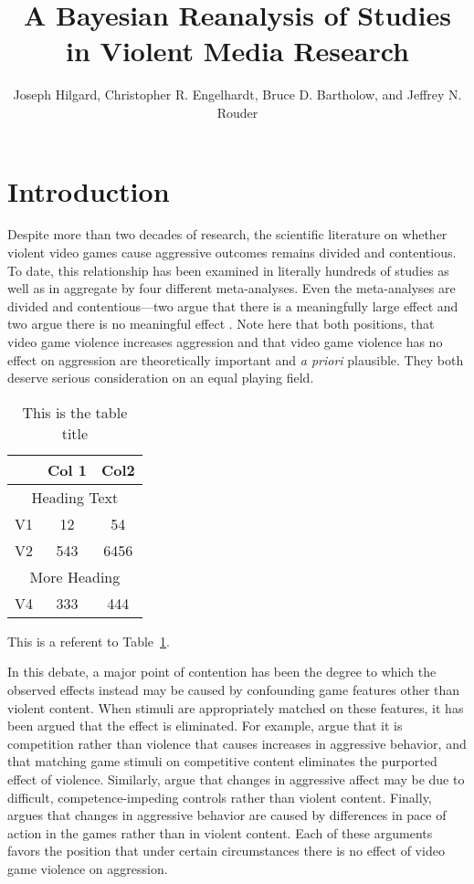 \documentclass[fignum,nobf,man]{apa}
\author{Joseph Hilgard, Christopher R. Engelhardt, Bruce D. Bartholow, and Jeffrey N. Rouder}
\title{A Bayesian Reanalysis of Studies in Violent Media Research}
\affiliation{University of Missouri}
\begin{document}
\maketitle

\section*{Introduction}
Despite more than two decades of research, the scientific literature on whether violent video games cause aggressive outcomes remains divided and contentious. To date, this relationship has been examined in literally hundreds of studies as well as in aggregate by four different meta-analyses. Even the meta-analyses are divided and contentious---two argue that there is a meaningfully large effect \citep{Anderson:etal:2010,Greitemeyer:Mugge:2014} and two argue there is no meaningful effect \citep[e.g.,][]{Ferguson:Kilburn:2009,Sherry:2001}. %
Note here that both positions, that video game violence increases aggression and that video game violence has no effect on aggression are theoretically important and {\em a priori} plausible.  They both deserve serious consideration on an equal playing field.  

%
\begin{table}
\caption{This is the table title}
\begin{tabular}{lcc}
&Col 1& Col2\\ \hline
\multicolumn{3}{c}{Heading Text}\\
V1 & 12 & 54\\
V2 & 543 & 6456\\
\multicolumn{3}{c}{More Heading}\\
V4 & 333 & 444\\ \hline
\end{tabular}
\label{sample}
\end{table}

This is a referent to Table~\ref{sample}.

In this debate, a major point of contention has been the degree to which the observed effects instead may be caused by confounding game features other than violent content. When stimuli are appropriately matched on these features, it has been argued that the effect is eliminated. For example, \citet{Adachi:Willoughby:2011} argue that it is competition rather than violence that causes increases in aggressive behavior, and that matching game stimuli on competitive content eliminates the purported effect of violence. Similarly, \citet{Przybylski:etal:2014} argue that changes in aggressive affect may be due to difficult, competence-impeding controls rather than violent content. Finally,  \citet{Elson:etal:2013} argues that changes in aggressive behavior are caused by differences in pace of action in the games rather than in violent content. Each of these arguments favors the position that under certain circumstances there is no effect of video game violence on aggression.
\end{document}
